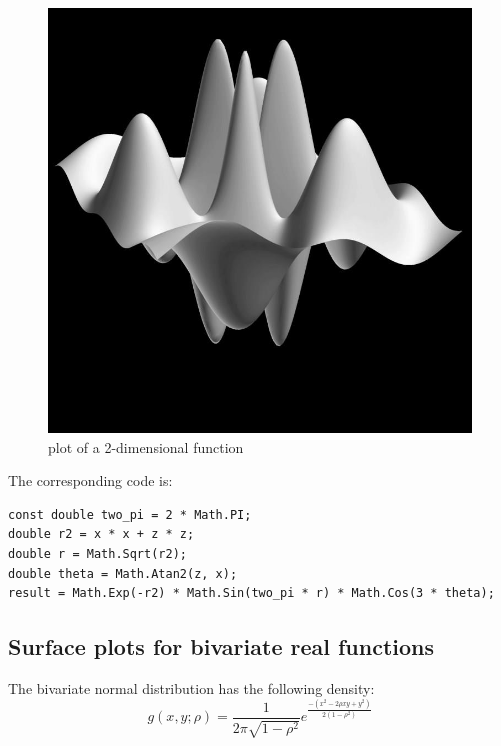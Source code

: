 \begin{figure}[ht]
	\centering
	\includegraphics[scale=3.0]{Charts/jpg/SurfaceBlackAndWhite.jpg}
	\caption{plot of a 2-dimensional function}
	\label{Fig plot of a 2-dimensional function}
\end{figure}


The corresponding code is:
\begin{lstlisting}
const double two_pi = 2 * Math.PI;
double r2 = x * x + z * z;
double r = Math.Sqrt(r2);
double theta = Math.Atan2(z, x);
result = Math.Exp(-r2) * Math.Sin(two_pi * r) * Math.Cos(3 * theta);
\end{lstlisting}


\newpage
\subsection{Surface plots for bivariate real functions}

The bivariate normal distribution has the following density:
\begin{equation}
	g(x,y;\rho) = \frac{1}{2 \pi \sqrt{1-\rho^2}} e^{\frac{-(x^2 -2\rho x y + y^2)}{2(1-\rho^2)}}
\end{equation}


